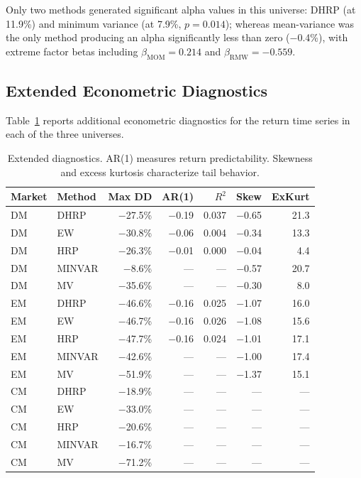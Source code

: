 Only two methods generated significant alpha values in this universe: DHRP (at 11.9\%) and minimum variance (at 7.9\%, $p = 0.014$); whereas mean-variance was the only method producing an alpha significantly less than zero ($-$0.4\%), with extreme factor betas including $\beta_{\text{MOM}} = 0.214$ and $\beta_{\text{RMW}} = -0.559$.

\subsection{Extended Econometric Diagnostics}

Table~\ref{tab:econometric} reports additional econometric diagnostics for the return time series in each of the three universes.

\begin{table}[t]
\centering
\caption{Extended diagnostics. AR(1) measures return predictability. Skewness and excess kurtosis characterize tail behavior.}
\label{tab:econometric}
\begin{tabular}{llrrrrr}
\toprule
Market & Method & Max DD & AR(1) & $R^2$ & Skew & ExKurt \\
\midrule
DM & DHRP & $-$27.5\% & $-$0.19 & 0.037 & $-$0.65 & 21.3 \\
DM & EW & $-$30.8\% & $-$0.06 & 0.004 & $-$0.34 & 13.3 \\
DM & HRP & $-$26.3\% & $-$0.01 & 0.000 & $-$0.04 & 4.4 \\
DM & MINVAR & $-$8.6\% & --- & --- & $-$0.57 & 20.7 \\
DM & MV & $-$35.6\% & --- & --- & $-$0.30 & 8.0 \\
\midrule
EM & DHRP & $-$46.6\% & $-$0.16 & 0.025 & $-$1.07 & 16.0 \\
EM & EW & $-$46.7\% & $-$0.16 & 0.026 & $-$1.08 & 15.6 \\
EM & HRP & $-$47.7\% & $-$0.16 & 0.024 & $-$1.01 & 17.1 \\
EM & MINVAR & $-$42.6\% & --- & --- & $-$1.00 & 17.4 \\
EM & MV & $-$51.9\% & --- & --- & $-$1.37 & 15.1 \\
\midrule
CM & DHRP & $-$18.9\% & --- & --- & --- & --- \\
CM & EW & $-$33.0\% & --- & --- & --- & --- \\
CM & HRP & $-$20.6\% & --- & --- & --- & --- \\
CM & MINVAR & $-$16.7\% & --- & --- & --- & --- \\
CM & MV & $-$71.2\% & --- & --- & --- & --- \\
\bottomrule
\end{tabular}
\end{table}

